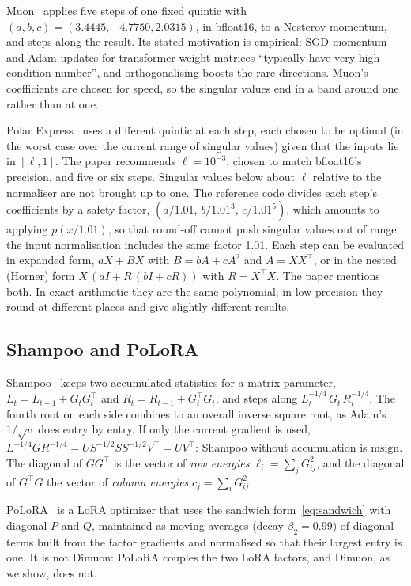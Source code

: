 \documentclass[11pt]{article}
\newcommand{\msign}{\mathrm{msign}}
\begin{document}
Muon~\cite{muon} applies five steps of one fixed quintic with $(a,b,c)=(3.4445,-4.7750,2.0315)$, in
bfloat16, to a Nesterov momentum, and steps along the result. Its stated motivation is empirical:
SGD-momentum and Adam updates for transformer weight matrices ``typically have very high condition
number'', and orthogonalising boosts the rare directions. Muon's coefficients are chosen for speed,
so the singular values end in a band around one rather than at one.

Polar Express~\cite{polarexpress} uses a different quintic at each step, each chosen to be optimal
(in the worst case over the current range of singular values) given that the inputs lie in
$[\ell,1]$. The paper recommends $\ell=10^{-3}$, chosen to match bfloat16's precision, and five or
six steps. Singular values below about $\ell$ relative to the normaliser are not brought up to one.
The reference code divides each step's coefficients by a safety factor,
$(a/1.01,\,b/1.01^3,\,c/1.01^5)$, which amounts to applying $p(x/1.01)$, so that round-off cannot
push singular values out of range; the input normalisation includes the same factor 1.01. Each step
can be evaluated in expanded form, $aX+BX$ with $B=bA+cA^2$ and $A=XX^\top$, or in the nested
(Horner) form $X\,(aI+R\,(bI+cR))$ with $R=X^\top X$. The paper mentions both. In exact arithmetic
they are the same polynomial; in low precision they round at different places and give slightly
different results.

\subsection{Shampoo and PoLoRA}
Shampoo~\cite{shampoo} keeps two accumulated statistics for a matrix parameter,
$L_t=L_{t-1}+G_tG_t^\top$ and $R_t=R_{t-1}+G_t^\top G_t$, and steps along
$L_t^{-1/4}\,G_t\,R_t^{-1/4}$. The fourth root on each side combines to an overall inverse square
root, as Adam's $1/\sqrt v$ does entry by entry. If only the current gradient is used,
$L^{-1/4}GR^{-1/4}=US^{-1/2}SS^{-1/2}V^\top=UV^\top$: Shampoo without accumulation is $\msign$.
The diagonal of $GG^\top$ is the vector of \emph{row energies} $\ell_i=\sum_jG_{ij}^2$, and the
diagonal of $G^\top G$ the vector of \emph{column energies} $c_j=\sum_iG_{ij}^2$.

PoLoRA~\cite{polora} is a LoRA optimizer that uses the sandwich form~\eqref{eq:sandwich} with
diagonal $P$ and $Q$, maintained as moving averages (decay $\beta_2=0.99$) of diagonal terms built
from the factor gradients and normalised so that their largest entry is one. It is not Dimuon:
PoLoRA couples the two LoRA factors, and Dimuon, as we show, does not.
\end{document}

